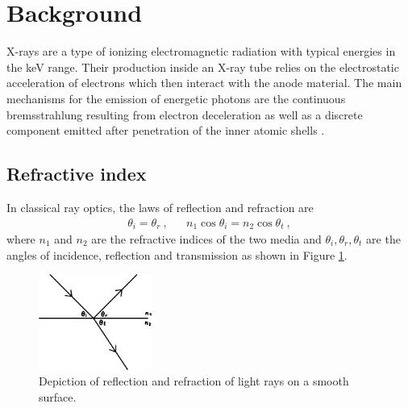 \section{Background}

X-rays are a type of ionizing electromagnetic radiation with typical energies in the \unit{\kilo\electronvolt} range. Their
production inside an X-ray tube relies on the electrostatic acceleration of electrons which then interact with the anode material. The main
mechanisms for the emission of energetic photons are the continuous bremsstrahlung resulting from electron deceleration as well as a
discrete component emitted after penetration of the inner atomic shells \cite{McMorrow_2011_1, McMorrow_2011_2}.



\subsection{Refractive index}

In classical ray optics, the laws of reflection and refraction are
\begin{align}
	\theta_i = \theta_r \: , && n_1 \cos\theta_i = n_2 \cos\theta_t \: ,
	\label{eqn:snell}
\end{align}
where $n_1$ and $n_2$ are the refractive indices of the two media and $\theta_i, \theta_r, \theta_t$ are the angles of incidence, reflection
and transmission as shown in Figure \ref{fig:fresnel}.

\begin{figure}[H]
	\centering
	\includegraphics[width=0.33\textwidth]{content/graphics/fresnel.pdf}
	\caption{Depiction of reflection and refraction of light rays on a smooth surface.}
	\label{fig:fresnel}
\end{figure}

